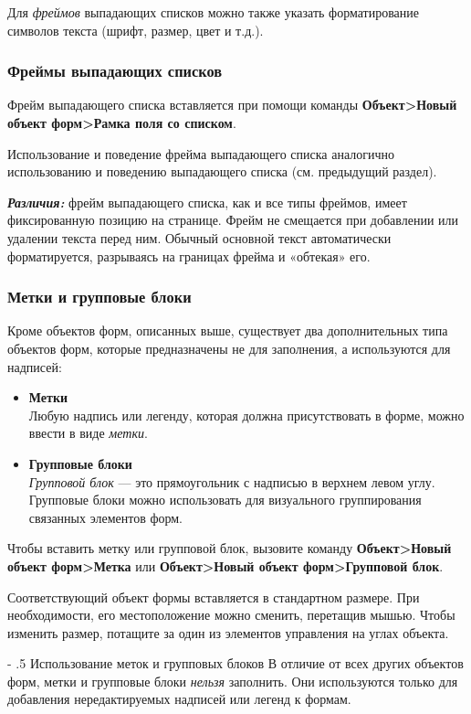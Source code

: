 ﻿\documentclass[a4paper,10pt]{article}
\makeatletter
\renewcommand\paragraph{%
   \@startsection{paragraph}{4}{0mm}%
      {-\baselineskip}%
      {.5\baselineskip}%
      {\normalfont\normalsize\bfseries}}
\makeatother
\begin{document}
 Для \textit{фреймов} выпадающих списков можно также указать форматирование символов текста (шрифт, размер, цвет и т.д.).

\subsubsection{Фреймы выпадающих списков}
Фрейм выпадающего списка вставляется при помощи команды \textbf{Объект>Новый объект форм>Рамка поля со списком}.

Использование и поведение фрейма выпадающего списка аналогично использованию и поведению выпадающего списка (см. предыдущий раздел).

\textbf{\textit{Различия:}} фрейм выпадающего списка, как и все типы фреймов, имеет фиксированную позицию на странице. Фрейм не смещается при добавлении или удалении текста перед ним. Обычный основной текст автоматически форматируется, разрываясь на границах фрейма и «обтекая» его.

\subsubsection{Метки и групповые блоки}
Кроме объектов форм, описанных выше, существует два дополнительных типа объектов форм, которые предназначены не для заполнения, а используются для надписей:

\begin{itemize}
 \item \textbf{Метки}\\
 Любую надпись или легенду, которая должна присутствовать в форме, можно ввести в виде \textit{метки}.
 \item \textbf{Групповые блоки}\\
 \textit{Групповой блок} — это прямоугольник с надписью в верхнем левом углу. Групповые блоки можно использовать для визуального группирования связанных элементов форм.
\end{itemize}

Чтобы вставить метку или групповой блок, вызовите команду \textbf{Объект>Новый объект форм>Метка} или \textbf{Объект>Новый объект форм>Групповой блок}.

Соответствующий объект формы вставляется в стандартном размере. При необходимости, его местоположение можно сменить, перетащив мышью. Чтобы изменить размер, потащите за один из элементов управления на углах объекта.

\paragraph{Использование меток и групповых блоков}
В отличие от всех других объектов форм, метки и групповые блоки \textit{нельзя} заполнить. Они используются только для добавления нередактируемых надписей или легенд к формам.
\end{document}
